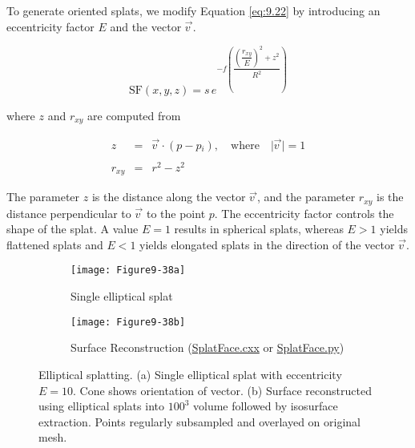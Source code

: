 \begin{description}[leftmargin=0cm,labelindent=0cm]
To generate oriented splats, we modify Equation \ref{eq:9.22} by introducing an eccentricity factor $E$ and the vector $\overrightarrow{v\  }$.

\begin{equation}\label{eq:9.23}
\text{SF}(x, y, z) = s\, e^{-f \left( \dfrac{ \left( \dfrac {r_{xy}}{E} \right) ^2 + z^2}{R^2} \right)}
\end{equation}

\noindent where $z$ and $r_{xy}$ are computed from

\begin{equation}\label{eq:9.24}
\begin{array}{lll}
z &=& \overrightarrow{v\ } \cdot (p - p{_i}), \quad \text{where} \quad \vert \overrightarrow{v\ } \vert = 1 \\ \\
r_{xy} &=& r^2 - z^2
\end{array}
\end{equation}

The parameter $z$ is the distance along the vector $\overrightarrow{v\ }$, and the parameter $r_{xy}$ is the distance perpendicular to $\overrightarrow{v\ }$ to the point $p$. The eccentricity factor controls the shape of the splat. A value $E = 1$ results in spherical splats, whereas $E > 1$ yields flattened splats and $E < 1$ yields elongated splats in the direction of the vector $\overrightarrow{v\ }$.

\begin{figure}[htb]
    \centering
	\begin{subfigure}[h]{0.48\linewidth}
		\texttt{[image: Figure9-38a]}
		\captionsetup{justification=centering}
		\caption{Single elliptical splat}
		\label{fig:Figure9-38a}
	\end{subfigure}
	\hfill
	\begin{subfigure}[h]{0.48\linewidth}
		\texttt{[image: Figure9-38b]}
		\captionsetup{justification=centering}
		\caption{Surface Reconstruction (\href{https://lorensen.github.io/VTKExamples/site/Cxx/VisualizationAlgorithms/SplatFace/}{SplatFace.cxx} or \href{https://lorensen.github.io/VTKExamples/site/Python/VisualizationAlgorithms/SplatFace/}{SplatFace.py})}
		\label{fig:Figure9-38b}
	\end{subfigure}
	\caption{Elliptical splatting. (a) Single elliptical splat with eccentricity $E=10$. Cone shows orientation of vector. (b) Surface reconstructed using elliptical splats into $100^3$ volume followed by isosurface extraction. Points regularly subsampled and overlayed on original mesh.}\label{fig:Figure9-38}
\end{figure}


\end{description}
